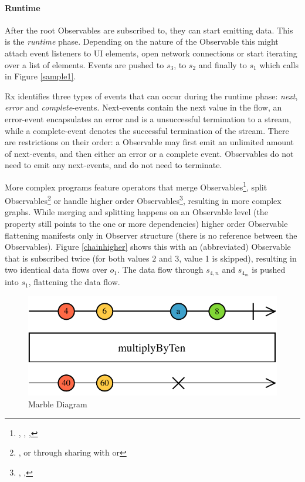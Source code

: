 \paragraph{Runtime} After the root Observables are subscribed to, they can start emitting data. This is the \emph{runtime} phase. Depending on the nature of the Observable this might attach event listeners to UI elements, open network connections or start iterating over a list of elements. Events are pushed to $s_3$, to $s_2$ and finally to $s_1$ which calls  in Figure \ref{sample1}. 

Rx identifies three types of events that can occur during the runtime phase: \emph{next}, \emph{error} and \emph{complete}-events. Next-events contain the next value in the flow, an error-event encapsulates an error and is a unsuccessful termination to a stream, while a complete-event denotes the successful termination of the stream. There are restrictions on their order: a Observable may first emit an unlimited amount of next-events, and then either an error or a complete event. Observables do not need to emit any next-events, and do not need to terminate.

More complex programs feature operators that merge Observables\footnote{
	, , , 
}, split Observables\footnote{
	, or through sharing with  or 
} or handle higher order Observables\footnote{
	, , 
}, resulting in more complex graphs. While merging and splitting happens on an Observable level (the  property still points to the one or more dependencies) higher order Observable flattening manifests only in Observer structure (there is no reference between the Observables). Figure \ref{chainhigher} shows this with an (abbreviated)  Observable that is subscribed twice (for both values $2$ and $3$, value 1 is skipped), resulting in two identical data flows over $o_1$. The data flow through $s_{4,n}$ and $s_{4_m}$ is pushed into $s_1$, flattening the data flow. 

\begin{figure}[t]
\centering
\includegraphics[width=\columnwidth]{images/marble-diagram.pdf}
\caption{Marble Diagram}
\label{marblediagram-image}
\end{figure}

